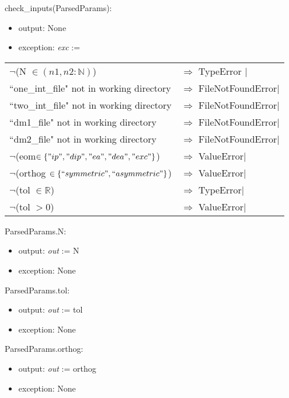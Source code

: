 \documentclass[12pt, titlepage]{article}
\begin{document}
\noindent check\_inputs(ParsedParams):
\begin{itemize}
	\item output: None 
	\item exception: \textit{exc} :=  
\end{itemize}
\noindent \begin{longtable*}[l]{l l}
	$\neg$(N $\in (n1, n2:\mathbb{N})$) & $\Rightarrow$ TypeError 
	$\vert$\\
	``one\_int\_file" not in working directory & $\Rightarrow$ 
	FileNotFoundError$\vert$\\
	``two\_int\_file" not in working directory & $\Rightarrow$ 
	FileNotFoundError$\vert$\\
	``dm1\_file" not in working directory & $\Rightarrow$ 
	FileNotFoundError$\vert$\\
	``dm2\_file" not in working directory & $\Rightarrow$ 
	FileNotFoundError$\vert$\\
	$\neg$(eom$\in \{"ip", "dip", "ea", "dea", "exc"\}$)  & 
	$\Rightarrow$ ValueError$\vert$\\
	$\neg$(orthog $\in \{``symmetric", ``asymmetric"\}$) & 
	$\Rightarrow$ ValueError$\vert$\\
	$\neg$(tol $\in \mathbb{R}$) & $\Rightarrow$ TypeError$\vert$\\
	$\neg$(tol $> 0$) & $\Rightarrow$ ValueError$\vert$\\
\end{longtable*}

\noindent ParsedParams.N:
\begin{itemize}
	\item output: \textit{out} := N
	\item exception: None 
\end{itemize}

\noindent ParsedParams.tol:
\begin{itemize}
	\item output: \textit{out} := tol 
	\item exception: None 
\end{itemize}

\noindent ParsedParams.orthog:
\begin{itemize}
	\item output: \textit{out} := orthog
	\item exception: None 
\end{itemize}
\end{document}
